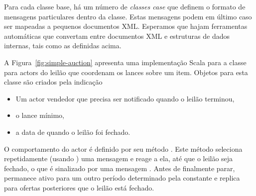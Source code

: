 Para cada classe base, h\'{a} um n\'{u}mero de {\em classes case} que definem
o formato de mensagens particulares dentro da classe. Estas mensagens
podem em \'{u}ltimo caso ser mapeadas a pequenos documentos XML. Esperamos
que hajam ferramentas autom\'{a}ticas que convertam entre documentos XML e 
estruturas de dados internas, tais como as definidas acima.
%

A Figura~\ref{fig:simple-auction} apresenta uma implementa\c{c}\~{a}o Scala para a classe
 para actors do leil\~{a}o que coordenam os lances sobre um item. Objetos
para esta classe s\~{a}o criados pela indica\c{c}\~{a}o
\begin{itemize}
\item Um actor vendedor que precisa ser notificado quando o leil\~{a}o terminou,
\item o lance m\'{i}nimo,
\item a data de quando o leil\~{a}o foi fechado.
\end{itemize}  
O comportamento do actor \'{e} definido por seu m\'{e}todo . Este m\'{e}todo seleciona
repetidamente (usando ) uma mensagem e reage a ela, at\'{e} que o 
leil\~{a}o seja fechado, o que \'{e} sinalizado por uma mensagem . Antes de 
finalmente parar, permanece ativo para um outro per\'{i}odo determinado pela constante 
 e replica para ofertas posteriores que o leil\~{a}o est\'{a} fechado.    

